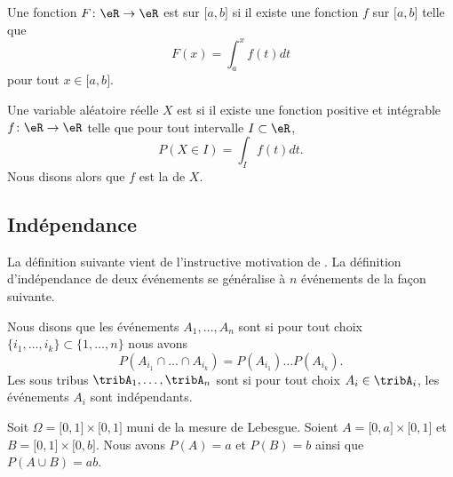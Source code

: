 \begin{definition}      \label{DefAbsoluCont}
    Une fonction \( F\colon \eR\to \eR\) est  sur \( \mathopen[ a , b \mathclose]\) si il existe une fonction \( f\) sur \( \mathopen[ a , b \mathclose]\) telle que
    \begin{equation}
        F(x)=\int_a^xf(t)dt
    \end{equation}
    pour tout \( x\in\mathopen[ a , b \mathclose]\).

    Une variable aléatoire réelle \( X\) est  si il existe une fonction positive et intégrable \( f\colon \eR\to \eR\) telle que pour tout intervalle \( I\subset\eR\),
    \begin{equation}
        P(X\in I)=\int_If(t)dt.
    \end{equation}
    Nous disons alors que \( f\) est la  de \( X\).
\end{definition}


\subsection{Indépendance}

La définition suivante vient de l'instructive motivation de \cite{CourgGudRennes}. La définition d'indépendance de deux événements se généralise à \( n\) événements de la façon suivante.
\begin{definition}
    Nous disons que les événements \( A_1,\ldots,A_n\) sont  si pour tout choix \( \{ i_1,\ldots,i_k \}\subset\{ 1,\ldots,n \}\) nous avons
    \begin{equation}
        P(A_{i_1}\cap\ldots\cap A_{i_k})=P(A_{i_1})\ldots P(A_{i_k}).
    \end{equation}
    Les sous tribus \( \tribA_1,\ldots,\tribA_n\) sont  si pour tout choix \( A_i\in \tribA_i\), les événements \( A_i\) sont indépendants.
\end{definition}

\begin{example}
    Soit \( \Omega=\mathopen[ 0 , 1 \mathclose]\times \mathopen[ 0 , 1 \mathclose]\) muni de la mesure de Lebesgue. Soient \( A=\mathopen[ 0 , a \mathclose]\times \mathopen[ 0 , 1 \mathclose]\) et \( B=\mathopen[ 0 , 1 \mathclose]\times \mathopen[ 0 , b \mathclose]\). Nous avons \( P(A)=a\) et \( P(B)=b\) ainsi que \( P(A\cup B)=ab\).
\end{example}

